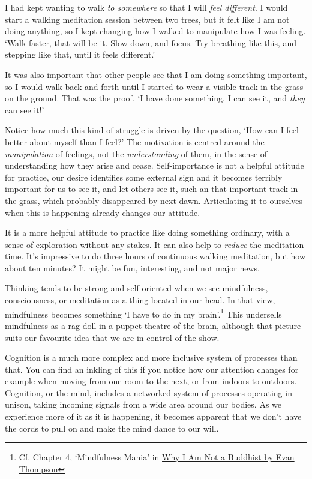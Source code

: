 I had kept wanting to walk \emph{to somewhere} so that I will \emph{feel
different}. I would start a walking meditation session between two
trees, but it felt like I am not doing anything, so I kept changing how
I walked to manipulate how I was feeling. `Walk faster, that will be it.
Slow down, and focus. Try breathing like this, and stepping like that,
until it feels different.'

It was also important that other people see that I am doing something
important, so I would walk back-and-forth until I started to wear a
visible track in the grass on the ground. That was the proof, `I have
done something, I can see it, and \emph{they} can see it!'

Notice how much this kind of struggle is driven by the question, `How
can I feel better about myself than I feel?' The motivation is centred
around the \emph{manipulation} of feelings, not the \emph{understanding}
of them, in the sense of understanding how they arise and cease.
Self-importance is not a helpful attitude for practice, our desire
identifies some external sign and it becomes terribly important for us
to see it, and let others see it, such an that important track in the
grass, which probably disappeared by next dawn. Articulating it to
ourselves when this is happening already changes our attitude.

It is a more helpful attitude to practice like doing something ordinary,
with a sense of exploration without any stakes. It can also help to
\emph{reduce} the meditation time. It's impressive to do three hours of
continuous walking meditation, but how about ten minutes? It might be
fun, interesting, and not major news.


Thinking tends to be strong and self-oriented when we see mindfulness,
consciousness, or meditation as a thing located in our head. In that
view, mindfulness becomes something `I have to do in my
brain'.\footnote{Cf. Chapter 4, `Mindfulness Mania' in
  \href{https://www.goodreads.com/book/show/44439993-why-i-am-not-a-buddhist}{Why
  I Am Not a Buddhist by Evan Thompson}} This undersells mindfulness as
a rag-doll in a puppet theatre of the brain, although that picture suits
our favourite idea that we are in control of the show.

\enlargethispage*{\baselineskip}

Cognition is a much more complex and more inclusive system of processes
than that. You can find an inkling of this if you notice how our
attention changes for example when moving from one room to the next, or
from indoors to outdoors. Cognition, or the mind, includes a networked
system of processes operating in unison, taking incoming signals from a
wide area around our bodies. As we experience more of it as it is
happening, it becomes apparent that we don't have the cords to pull on
and make the mind dance to our will.

